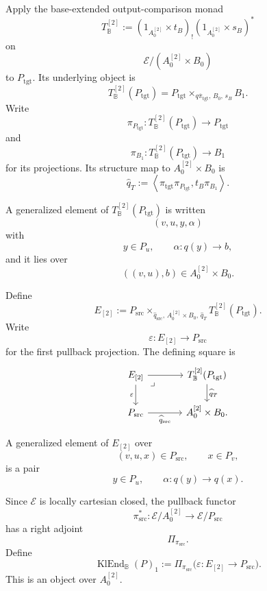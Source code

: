 Apply the base-extended output-comparison monad
\[
    T_{\mathbb B}^{[2]}
    :=
    (1_{A_0^{[2]}}\times t_B)_!
    (1_{A_0^{[2]}}\times s_B)^*
\]
on
\[
    \mathcal E/(A_0^{[2]}\times B_0)
\]
to \(P_{\mathrm{tgt}}\). Its underlying object is
\[
    T_{\mathbb B}^{[2]}(P_{\mathrm{tgt}})
    =
    P_{\mathrm{tgt}}
    \times_{
        q\overline\pi_{\mathrm{tgt}},\,
        B_0,\,
        s_B
    }
    B_1.
\]
Write
\[
    \pi_{P_{\mathrm{tgt}}}:
    T_{\mathbb B}^{[2]}(P_{\mathrm{tgt}})
    \to P_{\mathrm{tgt}}
\]
and
\[
    \pi_{B_1}:
    T_{\mathbb B}^{[2]}(P_{\mathrm{tgt}})
    \to B_1
\]
for its projections. Its structure map to
\(A_0^{[2]}\times B_0\) is
\[
    \widehat q_T
    :=
    \left\langle
        \pi_{\mathrm{tgt}}\pi_{P_{\mathrm{tgt}}},
        t_B\pi_{B_1}
    \right\rangle.
\]

A generalized element of
\(T_{\mathbb B}^{[2]}(P_{\mathrm{tgt}})\) is written
\[
    (v,u,y,\alpha)
\]
with
\[
    y\in P_u,
    \qquad
    \alpha:q(y)\to b,
\]
and it lies over
\[
    ((v,u),b)\in A_0^{[2]}\times B_0.
\]

Define
\[
    E_{[2]}
    :=
    P_{\mathrm{src}}
    \times_{
        \widehat q_{\mathrm{src}},\,
        A_0^{[2]}\times B_0,\,
        \widehat q_T
    }
    T_{\mathbb B}^{[2]}(P_{\mathrm{tgt}}).
\]
Write
\[
    \varepsilon:
    E_{[2]}\to P_{\mathrm{src}}
\]
for the first pullback projection. The defining square is
\[
\begin{tikzcd}[column sep=large]
    E_{[2]}
        \arrow[r]
        \arrow[d, "\varepsilon"']
        \arrow[dr, phantom, "\lrcorner", very near start]
    &
    T_{\mathbb B}^{[2]}(P_{\mathrm{tgt}})
        \arrow[d, "\widehat q_T"]
    \\
    P_{\mathrm{src}}
        \arrow[r, "\widehat q_{\mathrm{src}}"']
    &
    A_0^{[2]}\times B_0.
\end{tikzcd}
\]

A generalized element of \(E_{[2]}\) over
\[
    (v,u,x)\in P_{\mathrm{src}},
    \qquad
    x\in P_v,
\]
is a pair
\[
    y\in P_u,
    \qquad
    \alpha:q(y)\to q(x).
\]

Since \(\mathcal E\) is locally cartesian closed, the pullback functor
\[
    \pi_{\mathrm{src}}^*:
    \mathcal E/A_0^{[2]}
    \to
    \mathcal E/P_{\mathrm{src}}
\]
has a right adjoint
\[
    \Pi_{\pi_{\mathrm{src}}}.
\]
Define
\[
    \operatorname{KlEnd}_{\mathbb B}(P)_1
    :=
    \Pi_{\pi_{\mathrm{src}}}
    \bigl(
        \varepsilon:E_{[2]}\to P_{\mathrm{src}}
    \bigr).
\]
This is an object over \(A_0^{[2]}\).


